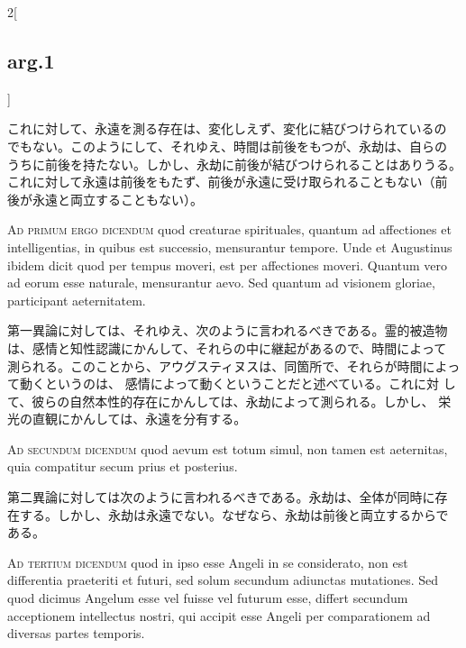 \documentclass[paper=a4paper,fontsize=10pt,jafontsize=9pt,titlepage]{jlreq}
\begin{document}
\begin{paracol}{2}[\subsection{arg.1}]
\switchcolumn

これに対して、永遠を測る存在は、変化しえず、変化に結びつけられているの
でもない。このようにして、それゆえ、時間は前後をもつが、永劫は、自らの
うちに前後を持たない。しかし、永劫に前後が結びつけられることはありうる。
これに対して永遠は前後をもたず、前後が永遠に受け取られることもない（前
後が永遠と両立することもない）。

\switchcolumn*[\subsection{ad.1}]

{\scshape Ad primum ergo dicendum} quod creaturae spirituales, quantum
 ad affectiones et intelligentias, in quibus est successio, mensurantur
 tempore. Unde et Augustinus ibidem dicit quod per tempus moveri, est
 per affectiones moveri. Quantum vero ad eorum esse naturale,
 mensurantur aevo. Sed quantum ad visionem gloriae, participant
 aeternitatem.

\switchcolumn

第一異論に対しては、それゆえ、次のように言われるべきである。霊的被造物
は、感情と知性認識にかんして、それらの中に継起があるので、時間によって
測られる。このことから、アウグスティヌスは、同箇所で、それらが時間によっ
て動くというのは、 感情によって動くということだと述べている。これに対
して、彼らの自然本性的存在にかんしては、永劫によって測られる。しかし、
栄光の直観にかんしては、永遠を分有する。

\switchcolumn*[\subsection{ad.2}]

{\scshape Ad secundum dicendum} quod aevum est totum simul, non tamen
 est aeternitas, quia compatitur secum prius et posterius.

\switchcolumn

第二異論に対しては次のように言われるべきである。永劫は、全体が同時に存
在する。しかし、永劫は永遠でない。なぜなら、永劫は前後と両立するからで
ある。

\switchcolumn*[\subsection{ad.3}]

{\scshape Ad tertium dicendum} quod in ipso esse Angeli in se
considerato, non est differentia praeteriti et futuri, sed solum
secundum adiunctas mutationes. Sed quod dicimus Angelum esse vel fuisse
vel futurum esse, differt secundum acceptionem intellectus nostri, qui
accipit esse Angeli per comparationem ad diversas partes temporis.


\end{paracol}
\end{document}
